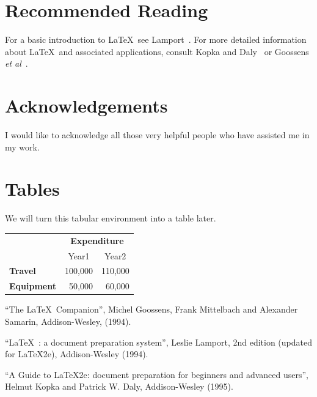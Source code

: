 \documentclass[12pt]{scrbook}
\begin{document}
\chapter{Recommended Reading}

For a basic introduction to \LaTeX\ see Lamport~\cite{lamport94}.
For more detailed information about \LaTeX\ and
associated applications, consult Kopka and Daly~\cite{kopka95}
or Goossens \emph{et al}~\cite{goossens94}.

\chapter*{Acknowledgements}

I would like to acknowledge all those
very helpful people who have assisted
me in my work.

\appendix
\chapter{Tables}

We will turn this tabular environment into a table later.

\begin{tabular}{lrr}
 & \multicolumn{2}{c}{\bfseries Expenditure}\\
 & \multicolumn{1}{c}{Year1} & \multicolumn{1}{c}{Year2}\\
\bfseries Travel & 100,000 & 110,000\\
\bfseries Equipment & 50,000 & 60,000
\end{tabular}

\begin{thebibliography}{1}
 ``The \LaTeX\ Companion'', Michel Goossens, Frank Mittelbach and
Alexander Samarin, Addison-Wesley, (1994).

 ``\LaTeX\ : a document preparation system'', Leslie Lamport,
2nd edition (updated for \LaTeX2e), Addison-Wesley (1994).

 ``A Guide to \LaTeX2e: document preparation for beginners
and advanced users'', Helmut Kopka and Patrick W. Daly, Addison-Wesley (1995).

\end{thebibliography}
\end{document}
